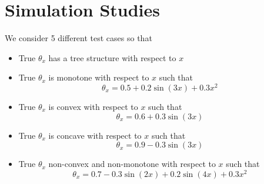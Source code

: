 \documentclass{amsart}
\begin{document}
\section{Simulation Studies}

We consider 5 different test cases so that
\begin{itemize}
    \item True $\theta_x$ has a tree structure with respect to $x$
    \item True $\theta_x$ is monotone with respect to $x$ such that 
    \begin{equation}
        \theta_x = 0.5 + 0.2 \sin(3x) + 0.3x^2
    \end{equation}
    \item True $\theta_x$ is convex with respect to $x$ such that 
    \begin{equation}
        \theta_x = 0.6 + 0.3 \sin(3x)
    \end{equation}
    \item True $\theta_x$ is concave with respect to $x$ such that 
    \begin{equation}
        \theta_x = 0.9 - 0.3 \sin(3x)
    \end{equation}
    \item True $\theta_x$ non-convex and non-monotone with respect to $x$ such that 
    \begin{equation}
        \theta_x = 0.7 - 0.3 \sin(2x) + 0.2 \sin(4x) + 0.3 x^2
    \end{equation}
\end{itemize}

\end{document}
